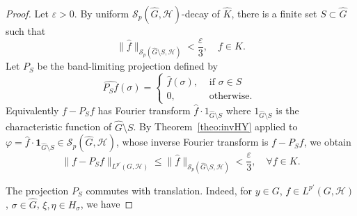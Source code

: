 \documentclass[10pt,a4paper]{amsart}
\begin{document}
\begin{proof}
Let $\varepsilon>0$. By uniform $\mathscr{S}_p(\widehat{G},\mathcal{H})$-decay of
$\widehat K$, there is a finite set $S\subset\widehat{G}$ such that
$$
\|\widehat f\|_{\mathscr{S}_p(\widehat{G}\setminus S,\mathcal{H})}<\frac{\varepsilon}{3},\quad f\in K.
$$
Let $P_S$ be the band-limiting projection defined by
$$\widehat{P_Sf}(\sigma)=\left\lbrace\begin{array}{cc}
\widehat f(\sigma), & \text{ if } \sigma\in S\\ 
0, & \text{ otherwise. }
\end{array}\right.$$ 
 Equivalently $f-P_Sf$ has Fourier transform
$\widehat f\cdot 1_{\widehat{G}\setminus S}$ where $1_{\widehat{G}\setminus S}$ is the characteristic function of $\widehat{G}\setminus S$. By Theorem~\ref{theo:invHY} applied to $\varphi=\widehat f\cdot\mathbf1_{\widehat{G}\setminus S}
\in\mathscr{S}_p(\widehat{G},\mathcal{H})$, whose inverse Fourier transform is $f-P_Sf$, we obtain
\begin{equation}\label{RLL}
\|f-P_Sf\|_{L^{p'}(G,\mathcal{H})}\le\|\widehat f\|_{\mathscr{S}_p(\widehat{G}\setminus S,\mathcal{H})}<\frac{\varepsilon}{3},
\quad \forall f\in K. 
\end{equation}

The projection $P_S$ commutes with translation. Indeed, for $y\in G$, $f\in L^{p'}(G,\mathcal{H})$,
$\sigma\in\widehat{G}$, $\xi,\eta\in H_\sigma$,  we have


\end{proof}
\end{document}
